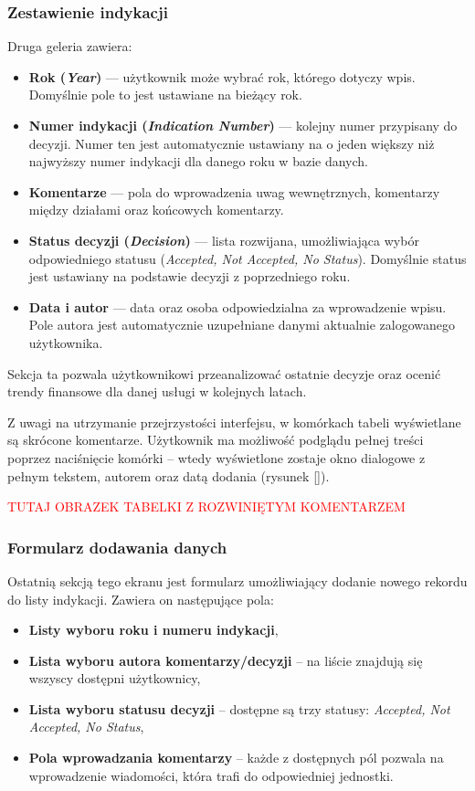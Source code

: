 \subsubsection*{Zestawienie indykacji}
Druga geleria zawiera:
 \begin{itemize}
 \item \textbf{Rok (\emph{Year})} — użytkownik może wybrać rok, którego dotyczy wpis. Domyślnie pole to jest ustawiane na bieżący rok.
 \item \textbf{Numer indykacji (\emph{Indication Number})} — kolejny numer przypisany do decyzji. Numer ten jest automatycznie ustawiany na o jeden większy niż najwyższy numer indykacji dla danego roku w bazie danych.
 \item \textbf{Komentarze} — pola do wprowadzenia uwag wewnętrznych, komentarzy między działami oraz końcowych komentarzy.
 \item \textbf{Status decyzji (\emph{Decision})} — lista rozwijana, umożliwiająca wybór odpowiedniego statusu (\emph{Accepted, Not Accepted, No Status}). Domyślnie status jest ustawiany na podstawie decyzji z poprzedniego roku.
 \item \textbf{Data i autor} — data oraz osoba odpowiedzialna za wprowadzenie wpisu. Pole autora jest automatycznie uzupełniane danymi aktualnie zalogowanego użytkownika.
 \end{itemize}
 Sekcja ta pozwala użytkownikowi przeanalizować ostatnie decyzje oraz ocenić trendy finansowe dla danej usługi w kolejnych latach.

 Z uwagi na utrzymanie przejrzystości interfejsu, w komórkach tabeli wyświetlane są skrócone komentarze. Użytkownik ma możliwość podglądu pełnej treści poprzez naciśnięcie komórki -- wtedy wyświetlone zostaje okno dialogowe z pełnym tekstem, autorem oraz datą dodania (rysunek \ref{}).

 \textcolor{red}{TUTAJ OBRAZEK TABELKI Z ROZWINIĘTYM KOMENTARZEM}

\subsubsection*{Formularz dodawania danych}
 Ostatnią sekcją tego ekranu jest formularz umożliwiający dodanie nowego rekordu do listy indykacji. Zawiera on następujące pola:
 \begin{itemize}
 \item \textbf{Listy wyboru roku i numeru indykacji},
 \item \textbf{Lista wyboru autora komentarzy/decyzji} -- na liście znajdują się wszyscy dostępni użytkownicy,
 \item \textbf{Lista wyboru statusu decyzji} -- dostępne są trzy statusy: \emph{Accepted, Not Accepted, No Status},
 \item \textbf{Pola wprowadzania komentarzy} -- każde z dostępnych pól pozwala na wprowadzenie wiadomości, która trafi do odpowiedniej jednostki.
 \end{itemize}

